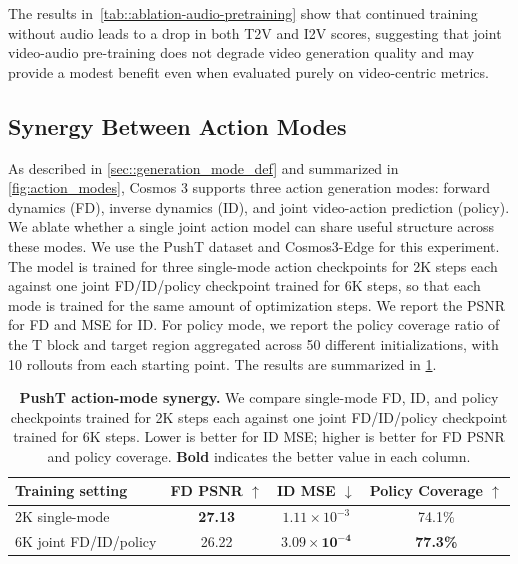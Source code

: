 \documentclass{llmxive}
\providecommand{\arraystretch}{1.5}
\begin{document}
The results in~\cref{tab::ablation-audio-pretraining} show that continued training without audio leads to a drop in both T2V and I2V scores, suggesting that joint video-audio pre-training does not degrade video generation quality and may provide a modest benefit even when evaluated purely on video-centric metrics.

\subsection{Synergy Between Action Modes}
\label{app:pusht_fd_id_policy_synergy}
As described in \cref{sec::generation_mode_def} and summarized in \cref{fig:action_modes}, Cosmos 3 supports three action generation modes: forward dynamics (FD), inverse dynamics (ID), and joint video-action prediction (policy).
We ablate whether a single joint action model can share useful structure across these modes.
We use the PushT dataset and Cosmos3-Edge for this experiment.
The model is trained for three single-mode action checkpoints for 2K steps each against one joint FD/ID/policy checkpoint trained for 6K steps, so that each mode is trained for the same amount of optimization steps.
We report the PSNR for FD and MSE for ID.
For policy mode, we report the policy coverage ratio of the T block and target region aggregated across 50 different initializations, with 10 rollouts from each starting point.
The results are summarized in \cref{tab:pusht_fd_id_policy_open_loop}.

\begin{table}[!htbp]
\centering
\small
\setlength{\tabcolsep}{7pt}
\renewcommand{\arraystretch}{1.15}
\begin{tabular}{@{}lccc@{}}
\toprule
\textbf{Training setting} & \textbf{FD PSNR $\uparrow$} & \textbf{ID MSE $\downarrow$} & \textbf{Policy Coverage $\uparrow$} \\
\midrule
2K single-mode & \textbf{27.13} & $1.11 \times 10^{-3}$ & 74.1\% \\
6K joint FD/ID/policy & 26.22 & $\boldsymbol{3.09 \times 10^{-4}}$ & \textbf{77.3\%} \\
\bottomrule
\end{tabular}
\caption{\textbf{PushT action-mode synergy.} We compare single-mode FD, ID, and policy checkpoints trained for 2K steps each against one joint FD/ID/policy checkpoint trained for 6K steps. Lower is better for ID MSE; higher is better for FD PSNR and policy coverage. \textbf{Bold} indicates the better value in each column.}
\label{tab:pusht_fd_id_policy_open_loop}
\end{table}
\end{document}
